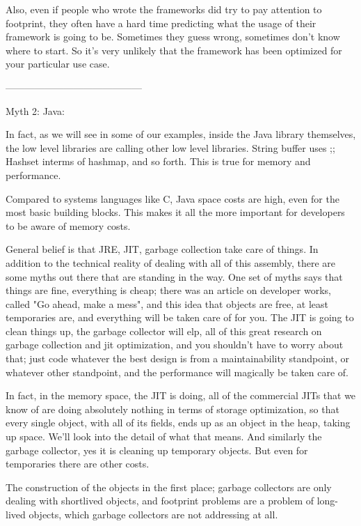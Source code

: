 Also, even if people who wrote the frameworks did try to pay attention to footprint, they often have a hard time predicting what the usage of their framework is going to be. Sometimes they guess wrong, sometimes don't know where to start.  So it's very unlikely that the framework has been optimized for your particular use case. 
 
 ------------------------------------------
 
 Myth 2:
 Java:

In fact, as we will see in some of our examples, inside the Java library themselves, the low level libraries are calling other low level libraries.  String buffer uses ;;  Hashset interms of hashmap, and so forth.  This is true for memory and performance.

Compared to systems languages like C, Java space costs are high, even for the most basic building blocks. This makes it all the more important for developers to be aware of memory costs.

General belief is that JRE, JIT, garbage collection take care of things.
In addition to the technical reality of dealing with all of this assembly, there are some myths out there that are standing in the way.  One set of myths says that things are fine, everything is cheap; there was an article on developer works, called "Go ahead, make a mess",  and this idea that objects are free, at least temporaries are, and everything will be taken care of for you. The JIT is going to clean things up, the garbage collector will elp, all of this great research on garbage collection and jit optimization, and you shouldn't have to worry about that; just code whatever the best design is from a maintainability standpoint, or whatever other standpoint, and the performance will magically be taken care of.

In fact, in the memory space, the JIT is doing, all of the commercial JITs that we know of are doing absolutely nothing in terms of storage optimization, so that every single object, with all of its fields, ends up as an object in the heap, taking up space.  We'll look into the detail of what that means. And similarly the garbage collector, yes it is cleaning up temporary objects. But even for temporaries there are other costs. 

The construction of the objects in the first place; garbage collectors are only dealing with shortlived objects, and footprint problems are a problem of long-lived objects, which garbage collectors are not addressing at all.

